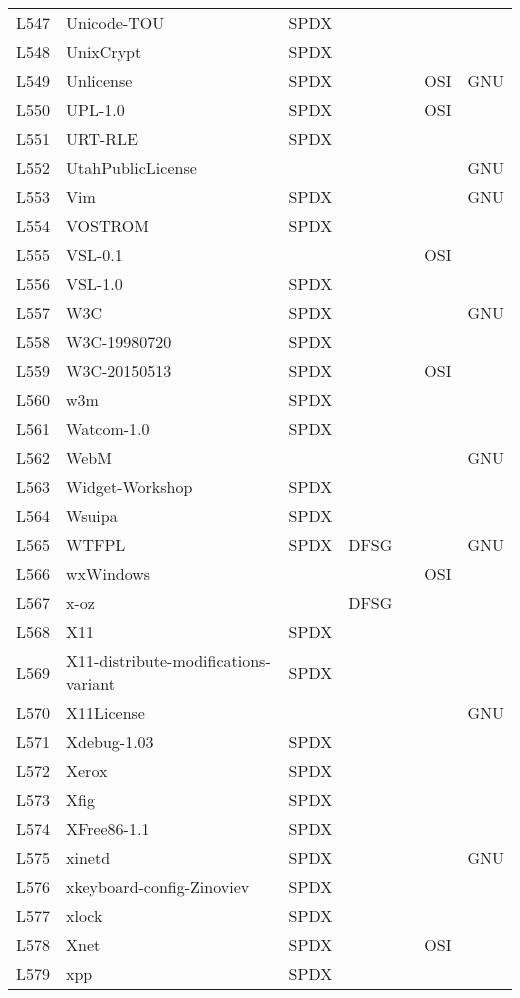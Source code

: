 \begin{longtable}[h]{m{2cm} | m{7cm} | c | c | c | c | c}
L547 & Unicode-TOU & SPDX &  &  &  &  \\
L548 & UnixCrypt & SPDX &  &  &  &  \\
L549 & Unlicense & SPDX &  &  & OSI & GNU \\
L550 & UPL-1.0 & SPDX &  &  & OSI &  \\
L551 & URT-RLE & SPDX &  &  &  &  \\
L552 & UtahPublicLicense &  &  &  &  & GNU \\
L553 & Vim & SPDX &  &  &  & GNU \\
L554 & VOSTROM & SPDX &  &  &  &  \\
L555 & VSL-0.1 &  &  &  & OSI &  \\
L556 & VSL-1.0 & SPDX &  &  &  &  \\
L557 & W3C & SPDX &  &  &  & GNU \\
L558 & W3C-19980720 & SPDX &  &  &  &  \\
L559 & W3C-20150513 & SPDX &  &  & OSI &  \\
L560 & w3m & SPDX &  &  &  &  \\
L561 & Watcom-1.0 & SPDX &  &  &  &  \\
L562 & WebM &  &  &  &  & GNU \\
L563 & Widget-Workshop & SPDX &  &  &  &  \\
L564 & Wsuipa & SPDX &  &  &  &  \\
L565 & WTFPL & SPDX & DFSG &  &  & GNU \\
L566 & wxWindows &  &  &  & OSI &  \\
L567 & x-oz &  & DFSG &  &  &  \\
L568 & X11 & SPDX &  &  &  &  \\
L569 & X11-distribute-modifications-variant & SPDX &  &  &  &  \\
L570 & X11License &  &  &  &  & GNU \\
L571 & Xdebug-1.03 & SPDX &  &  &  &  \\
L572 & Xerox & SPDX &  &  &  &  \\
L573 & Xfig & SPDX &  &  &  &  \\
L574 & XFree86-1.1 & SPDX &  &  &  &  \\
L575 & xinetd & SPDX &  &  &  & GNU \\
L576 & xkeyboard-config-Zinoviev & SPDX &  &  &  &  \\
L577 & xlock & SPDX &  &  &  &  \\
L578 & Xnet & SPDX &  &  & OSI &  \\
L579 & xpp & SPDX &  &  &  &  \\

\end{longtable}

